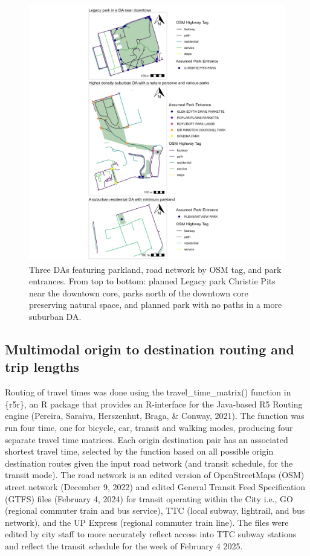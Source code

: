 \documentclass[
11pt, %
oneside, %
english, %
singlespacing, %
]{macthesis} %
\begin{document}
\begin{figure}

{\centering \includegraphics[width=6in]{./data/figures/chp2-park_entrance_example_plot} 

}

\caption{\label{fig:chp2-park_entrance_example_plot} Three DAs featuring parkland, road network by OSM tag, and park entrances. From top to bottom: planned Legacy park Christie Pits near the downtown core, parks north of the downtown core preserving natural space, and planned park with no paths in a more suburban DA.}\label{fig:unnamed-chunk-9}
\end{figure}

\subsection{Multimodal origin to destination routing and trip lengths}\label{multimodal-origin-to-destination-routing-and-trip-lengths}

Routing of travel times was done using the travel\_time\_matrix() function in \{r5r\}, an R package that provides an R-interface for the Java-based R5 Routing engine (Pereira, Saraiva, Herszenhut, Braga, \& Conway, 2021). The function was run four time, one for bicycle, car, transit and walking modes, producing four separate travel time matrices. Each origin destination pair has an associated shortest travel time, selected by the function based on all possible origin destination routes given the input road network (and transit schedule, for the transit mode). The road network is an edited version of OpenStreetMaps (OSM) street network (December 9, 2022) and edited General Transit Feed Specification (GTFS) files (February 4, 2024) for transit operating within the City i.e., GO (regional commuter train and bus service), TTC (local subway, lightrail, and bus network), and the UP Express (regional commuter train line). The files were edited by city staff to more accurately reflect access into TTC subway stations and reflect the transit schedule for the week of February 4 2025.
\end{document}
